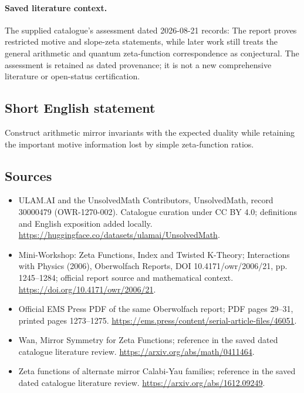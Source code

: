\documentclass[11pt]{article}
\begin{document}
\paragraph{Saved literature context.} The supplied catalogue's assessment dated 2026-08-21 records: The report proves restricted motive and slope-zeta statements, while later work still treats the general arithmetic and quantum zeta-function correspondence as conjectural. The assessment is retained as dated provenance; it is not a new comprehensive literature or open-status certification.
\subsection{Short English statement}
Construct arithmetic mirror invariants with the expected duality while retaining the important motive information lost by simple zeta-function ratios.
\subsection{Sources}
\begin{itemize}
\item[\hypertarget{source:30000479:1}{S1}] ULAM.AI and the UnsolvedMath Contributors, UnsolvedMath, record 30000479 (OWR-1270-002). Catalogue curation under CC BY 4.0; definitions and English exposition added locally.
\url{https://huggingface.co/datasets/ulamai/UnsolvedMath}.
\item[\hypertarget{source:30000479:2}{S2}] Mini-Workshop: Zeta Functions, Index and Twisted K-Theory; Interactions with Physics (2006), Oberwolfach Reports, DOI 10.4171/owr/2006/21, pp. 1245--1284; official report source and mathematical context.
\url{https://doi.org/10.4171/owr/2006/21}.
\item[\hypertarget{source:30000479:3}{S3}] Official EMS Press PDF of the same Oberwolfach report; PDF pages 29--31, printed pages 1273--1275.
\url{https://ems.press/content/serial-article-files/46051}.
\item[\hypertarget{source:30000479:4}{S4}] Wan, Mirror Symmetry for Zeta Functions; reference in the saved dated catalogue literature review.
\url{https://arxiv.org/abs/math/0411464}.
\item[\hypertarget{source:30000479:5}{S5}] Zeta functions of alternate mirror Calabi-Yau families; reference in the saved dated catalogue literature review.
\url{https://arxiv.org/abs/1612.09249}.
\end{itemize}
\label{end:30000479}
\end{document}
